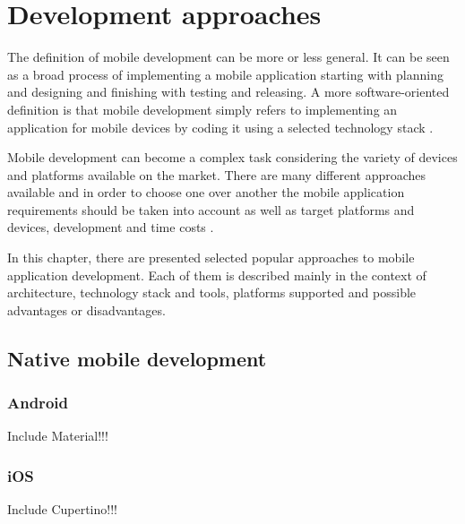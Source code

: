 
\section{Development approaches}

The definition of mobile development can be more or less general. It can be seen as a broad process of implementing a mobile application starting with planning and designing and finishing with testing and releasing. A more software-oriented definition is that mobile development simply refers to implementing an application for mobile devices by coding it using a selected technology stack \cite{microsoft_mobile_development}.

Mobile development can become a complex task considering the variety of devices and platforms available on the market. There are many different approaches available and in order to choose one over another the mobile application requirements should be taken into account as well as target platforms and devices, development and time costs \cite{velvetech_mobile_dev_approaches}.

In this chapter, there are presented selected popular approaches to mobile application development. Each of them is described mainly in the context of architecture, technology stack and tools, platforms supported and possible advantages or disadvantages.

\subsection{Native mobile development}



\subsubsection{Android}
Include Material!!!

\subsubsection{iOS}
Include Cupertino!!!